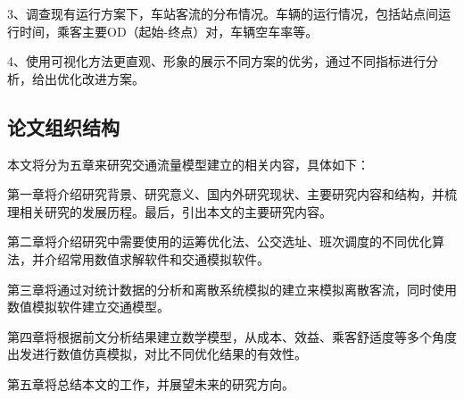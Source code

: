 3、调查现有运行方案下，车站客流的分布情况。车辆的运行情况，包括站点间运行时间，乘客主要OD（起始-终点）对，车辆空车率等。

4、使用可视化方法更直观、形象的展示不同方案的优劣，通过不同指标进行分析，给出优化改进方案。


\subsection{论文组织结构}
本文将分为五章来研究交通流量模型建立的相关内容，具体如下：

第一章将介绍研究背景、研究意义、国内外研究现状、主要研究内容和结构，并梳理相关研究的发展历程。最后，引出本文的主要研究内容。

第二章将介绍研究中需要使用的运筹优化法、公交选址、班次调度的不同优化算法，并介绍常用数值求解软件和交通模拟软件。

第三章将通过对统计数据的分析和离散系统模拟的建立来模拟离散客流，同时使用数值模拟软件建立交通模型。

第四章将根据前文分析结果建立数学模型，从成本、效益、乘客舒适度等多个角度出发进行数值仿真模拟，对比不同优化结果的有效性。

第五章将总结本文的工作，并展望未来的研究方向。
